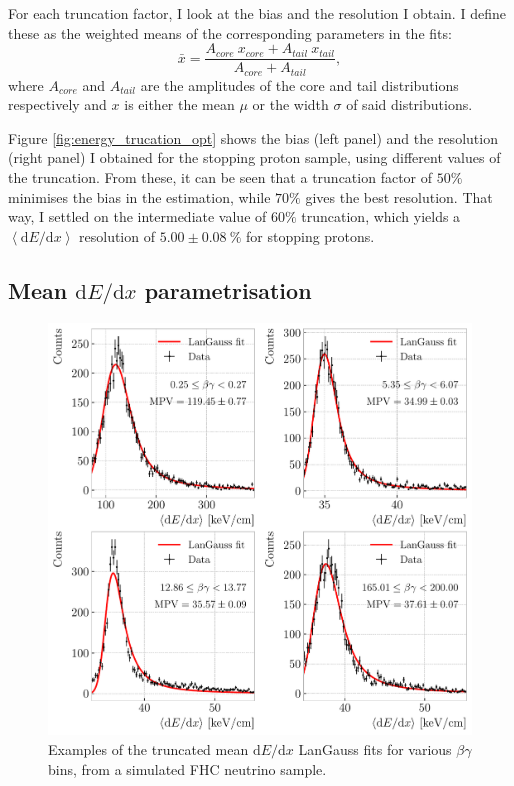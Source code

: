 For each truncation factor, I look at the bias and the resolution I obtain. I define these as the weighted means of the corresponding parameters in the fits:
\begin{equation}\label{eq:weighted_par_double_gauss}
	\bar{x} = \frac{A_{core}~x_{core}+A_{tail}~x_{tail}}{A_{core}+A_{tail}},
\end{equation}
where $A_{core}$ and $A_{tail}$ are the amplitudes of the core and tail distributions respectively and $x$ is either the mean $\mu$ or the width $\sigma$ of said distributions.

Figure \ref{fig:energy_trucation_opt} shows the bias (left panel) and the resolution (right panel) I obtained for the stopping proton sample, using different values of the truncation. From these, it can be seen that a truncation factor of $50\%$ minimises the bias in the estimation, while $70\%$ gives the best resolution. That way, I settled on the intermediate value of $60\%$ truncation, which yields a $\left<\mathrm{d}E/\mathrm{d}x\right>$ resolution of $5.00\pm0.08~\%$ for stopping protons.

\subsection[Mean \texorpdfstring{$\mathrm{d}E/\mathrm{d}x$}{dE/dx} parametrisation]{Mean \boldmath\texorpdfstring{$\mathrm{d}E/\mathrm{d}x$}{dE/dx} parametrisation}

\begin{figure}[t]
	\centering
	\includegraphics[width=.85\linewidth]{Images/GArSoft_PID/dEdx/dEdx_betagamma_examples.pdf}
	\caption[Examples of the truncated mean $\mathrm{d}E/\mathrm{d}x$ LanGauss fits for various $\beta\gamma$ bins, from a simulated FHC neutrino sample.]{Examples of the truncated mean $\mathrm{d}E/\mathrm{d}x$ LanGauss fits for various $\beta\gamma$ bins, from a simulated FHC neutrino sample.}
	\label{fig:dEdx_betagamma_fits}
\end{figure}


